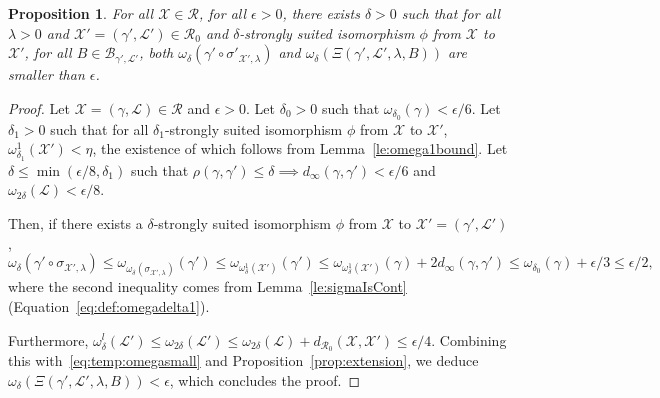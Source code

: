 \documentclass[11pt]{article}
\newtheorem{proposition}[theorem]{Proposition}
\def\Conf{{\mathscr{R}}}
\def\Att{{\Xi}}
\begin{document}
\begin{proposition}
  \label{prop:equicont}
  For all $\mathcal{X}\in \Conf$, for all $\epsilon>0$, there exists $\delta>0$ such that  for all $\lambda>0$ and
  $\mathcal{X}'=(\gamma',\mathcal{L}')\in \Conf_0$ and $\delta$-strongly suited isomorphism $\phi$ from $\mathcal{X}$ to $\mathcal{X}'$, for all $B\in \mathcal{B}_{\gamma',\mathcal{L}'}$,
  both $\omega_\delta(\gamma'\circ \sigma'_{\mathcal{X}',\lambda})$ and $\omega_\delta(\Att(\gamma',\mathcal{L}',\lambda,B))$ are smaller than $\epsilon$.
\end{proposition}
\begin{proof}
Let  $\mathcal{X}=(\gamma,\mathcal{L})\in \Conf$ and $\epsilon>0$.
Let $\delta_0>0$ such that $\omega_{\delta_0}(\gamma)<\epsilon/6$. Let $\delta_1>0$ such that for all
$\delta_1$-strongly suited isomorphism $\phi$ from $\mathcal{X}$ to $\mathcal{X}'$, $\omega^1_{\delta_1}(\mathcal{X}')<\eta$, the existence of which follows from Lemma~\ref{le:omega1bound}. Let $\delta\leq \min(\epsilon/8, \delta_1 )$ such that
$\rho(\gamma,\gamma')\leq \delta\implies d_\infty(\gamma,\gamma')<\epsilon/6$ and $\omega_{2\delta}(\mathcal{L})<\epsilon/8$.

Then, if there exists a $\delta$-strongly suited isomorphism $\phi$ from $\mathcal{X}$ to $\mathcal{X}'=(\gamma',\mathcal{L}')$,
\begin{equation}
\label{eq:temp:omegasmall}
\omega_\delta(\gamma'\circ \sigma_{\mathcal{X}',\lambda} )\leq \omega_{\omega_\delta(\sigma_{\mathcal{X}',\lambda}) }(\gamma')
\leq \omega_{\omega^1_\delta( \mathcal{X}')    }(\gamma')
\leq \omega_{\omega^1_\delta( \mathcal{X}')    }(\gamma)+2 d_\infty(\gamma,\gamma')\leq \omega_{\delta_0}(\gamma)+\epsilon/3\leq \epsilon/2,
\end{equation}
where the second inequality comes from Lemma~\ref{le:sigmaIsCont} (Equation~\eqref{eq:def:omegadelta1}).

Furthermore, $\omega^l_\delta(\mathcal{L}')\leq \omega_{2\delta}(\mathcal{L}')\leq \omega_{2\delta}(\mathcal{L})+ d_{\mathcal{R}_0}(\mathcal{X},\mathcal{X}' )\leq
\epsilon/4$. Combining this with~\eqref{eq:temp:omegasmall} and Proposition~\ref{prop:extension}, we deduce $\omega_\delta(\Att(\gamma',\mathcal{L}',\lambda,B))<\epsilon$, which concludes the proof.
\end{proof}
\end{document}
